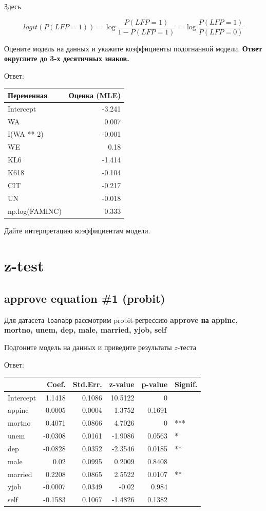 \documentclass[
  russian,
]{article}
\newcounter{none} %
\begin{document}
Здесь

\[
logit(P(LFP=1)) = \log\frac{P(LFP=1)}{1-P(LFP=1)} = \log\frac{P(LFP=1)}{P(LFP=0)}
\]

Оцените модель на данных и укажите коэффициенты подогнанной модели.
\textbf{Ответ округлите до 3-х десятичных знаков.}

Ответ:

{\def\LTcaptype{none} %
\begin{longtable}[]{@{}lr@{}}
\toprule\noalign{}
Переменная & Оценка (MLE) \\
\midrule\noalign{}
\endhead
\bottomrule\noalign{}
\endlastfoot
Intercept & -3.241 \\
WA & 0.007 \\
I(WA ** 2) & -0.001 \\
WE & 0.18 \\
KL6 & -1.414 \\
K618 & -0.104 \\
CIT & -0.217 \\
UN & -0.018 \\
np.log(FAMINC) & 0.333 \\
\end{longtable}
}

Дайте интерпретацию коэффициентам модели.

\section{z-test}\label{z-test}

\subsection{approve equation \#1
(probit)}\label{approve-equation-1-probit-1}

Для датасета \texttt{loanapp} рассмотрим probit-регрессию
\textbf{approve на appinc, mortno, unem, dep, male, married, yjob, self}

Подгоните модель на данных и приведите результаты \(z\)-теста

Ответ:

{\def\LTcaptype{none} %
\begin{longtable}[]{@{}lrrrrl@{}}
\toprule\noalign{}
& Coef. & Std.Err. & z-value & p-value & Signif. \\
\midrule\noalign{}
\endhead
\bottomrule\noalign{}
\endlastfoot
Intercept & 1.1418 & 0.1086 & 10.5122 & 0 & \\
appinc & -0.0005 & 0.0004 & -1.3752 & 0.1691 & \\
mortno & 0.4071 & 0.0866 & 4.7026 & 0 & *** \\
unem & -0.0308 & 0.0161 & -1.9086 & 0.0563 & * \\
dep & -0.0828 & 0.0352 & -2.3546 & 0.0185 & ** \\
male & 0.02 & 0.0995 & 0.2009 & 0.8408 & \\
married & 0.2208 & 0.0865 & 2.5522 & 0.0107 & ** \\
yjob & -0.0007 & 0.0349 & -0.02 & 0.984 & \\
self & -0.1583 & 0.1067 & -1.4826 & 0.1382 & \\
\end{longtable}
}
\end{document}
